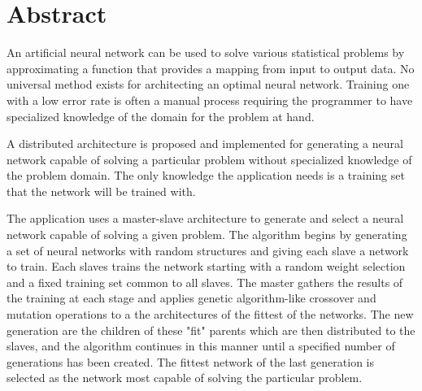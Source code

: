 \section*{Abstract}
An artificial neural network can be used to solve various statistical problems by approximating a function that provides a mapping from input to output data. No universal method exists for architecting an optimal neural network. Training one with a low error rate is often a manual process requiring the programmer to have specialized knowledge of the domain for the problem at hand.  

A distributed architecture is proposed and implemented for generating a neural network capable of solving a particular problem without specialized knowledge of the problem domain.  The only knowledge the application needs is a training set that the network will be trained with.  

The application uses a master-slave architecture to generate and select a neural network capable of solving a given problem.  The algorithm begins by generating a set of neural networks with random structures and giving each slave a network to train.  Each slaves trains the network starting with a random weight selection and a fixed training set common to all slaves. The master gathers the results of the training at each stage and applies genetic algorithm-like crossover and mutation operations to a the architectures of the fittest of the networks.  The new generation are the children of these "fit" parents which are then distributed to the slaves, and the algorithm continues in this manner until a specified number of generations has been created.  The fittest network of the last generation is selected as the network most capable of solving the particular problem.  


